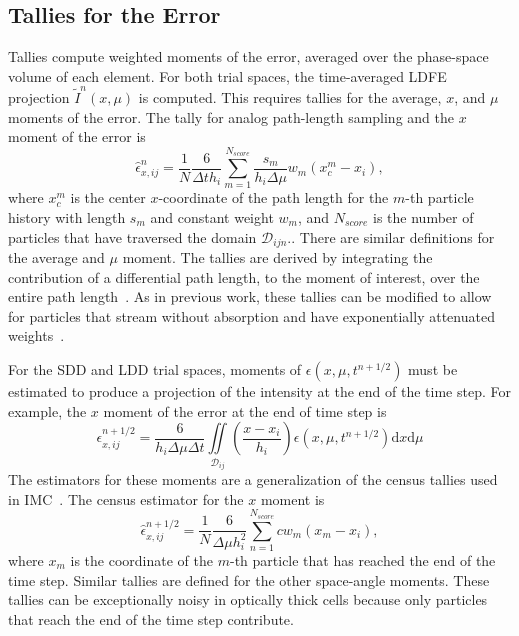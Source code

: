 \documentclass{anstrans}
\renewcommand{\d}{\mathrm{d}}
\begin{document}
\subsection{Tallies for the Error}

\label{app:tallies}
Tallies compute weighted moments of the error, averaged over the phase-space volume of each element. 
 For both trial spaces, the time-averaged LDFE projection  $\tilde I^n(x,\mu)$ is computed. 
This requires tallies for the average, $x$, and $\mu$ moments of the
error.  The tally for analog path-length sampling and the $x$ moment of the error is 
\begin{equation}
    {\hat \epsilon}^n_{x,ij} =\frac{1}{N} \frac{6}{\Delta t h_i} \sum_{m=1}^{N_{score}}
    \frac{s_m}{h_{i}\Delta \mu} w_m \left(x^m_c - x_i\right),
\end{equation}
where $x^m_c$ is the center $x$-coordinate of the path length for the $m$-th particle history with
length $s_m$ and constant weight $w_m$, and $N_{score}$ is the number of particles that have traversed the domain
$\mathcal{D}_{ijn}$..  There
are similar definitions for the average and $\mu$ moment.  The tallies are derived by
integrating the contribution of a differential path length, to the moment of interest, over the entire path
length~\cite{dissertation}.  As in previous work, these tallies can be modified to allow for particles that
stream without absorption and have exponentially attenuated weights~\cite{bolding_nse}. 

For the SDD and LDD trial spaces, moments of $\epsilon(x,\mu,t^{n+1/2})$ must be estimated to produce a projection of the intensity at
the end of the time step.
For example, the $x$ moment of the error at the end of time step is
\begin{equation}
    \epsilon^{n+1/2}_{x,ij} = \frac{6}{h_i\Delta \mu \Delta t} \iint\limits_{\mathcal{D}_{ij}} \left(\frac{x
    - x_i}{h_i}\right) \epsilon(x,\mu,t^{n+1/2}) \d x \d \mu
\end{equation}
The estimators for these moments are a generalization of the census
tallies used in IMC~\cite{wollaber_review,fnc}.   The census estimator for the $x$ moment is
\begin{equation}
    \hat\epsilon^{n+1/2}_{x,ij} = \frac{1}{N} \frac{6}{\Delta \mu h_i^2} \sum_{n=1}^{N_{score}}
    c w_m  \left(x_{m} - x_{i}\right),
\end{equation}
where $x_m$ is the coordinate of the $m$-th particle that has reached the end of the time step.
Similar tallies are defined for the other space-angle moments. These tallies can be
exceptionally noisy in optically thick cells because only particles that reach the end of the time step contribute.
\end{document}

